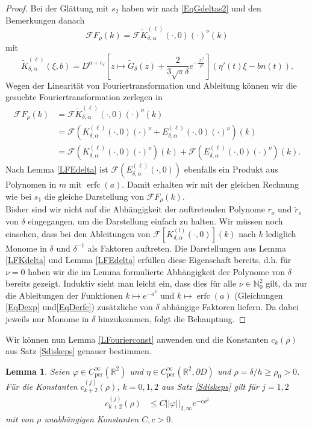 \documentclass[12pt,a4paper]{scrartcl}
\newtheorem{Lemma}[Satz]{Lemma}
\numberwithin{equation}{section}
\newcommand{\R}{\mathbb{R}} %
\newcommand{\N}{\mathbb{N}} %
\newcommand{\F}{\mathcal{F}} %
\newcommand{\per}{\operatorname{per}}
\newcommand{\erfc}{\operatorname{erfc}}
\begin{document}
\begin{proof}
Bei der Glättung mit $s_2$ haben wir nach \eqref{EqGdeltas2} und den Bemerkungen danach
\[
\F F_\rho(k) = \F \widetilde K_{\delta,\alpha}^{(\ell)}(\cdot,0)(\cdot)^\nu (k)
\]
mit
\[
\widetilde K_{\delta,\alpha}^{(\ell)}(\xi,b)=D^{\alpha+e_\ell}\left[z \mapsto \widetilde G_\delta(z) + \frac{2}{3 \sqrt{\pi} \delta } e^{-\frac{|z|^2}{\delta^2}}\right](\eta'(t) \xi - b n(t)).
\]
Wegen der Linearität von Fouriertransformation und Ableitung können wir die gesuchte Fouriertransformation zerlegen in
\begin{align*}
\F F_\rho(k) &= \F \widetilde K_{\delta,\alpha}^{(\ell)}(\cdot,0)(\cdot)^\nu (k) \\
&= \F \left(K_{\delta,\alpha}^{(\ell)}(\cdot,0)(\cdot)^\nu + E_{\delta,\alpha}^{(\ell)}(\cdot,0)(\cdot)^\nu\right)(k) \\
&= \F \left(K_{\delta,\alpha}^{(\ell)}(\cdot,0)(\cdot)^\nu\right)(k) +\F \left( E_{\delta,\alpha}^{(\ell)}(\cdot,0)(\cdot)^\nu \right)(k).
\end{align*}
Nach Lemma \ref{LFEdelta} ist $\F \left( E_{\delta,\alpha}^{(\ell)}(\cdot,0) \right)$ ebenfalls ein Produkt aus Polynomen in $m$ mit $\erfc(a)$. Damit erhalten wir mit der gleichen Rechnung wie bei $s_1$ die gleiche Darstellung von $\F F_\rho(k)$. 
\\
Bisher sind wir nicht auf die Abhängigkeit der auftretenden Polynome $r_o$ und $\tilde r_o$ von $\delta$ eingegangen, um die Darstellung einfach zu halten. Wir müssen noch einsehen, dass bei den Ableitungen von $\F[ K_{\delta,\alpha}^{(l)}(\cdot,0)](k)$ nach $k$ lediglich Monome in $\delta$ und $\delta^{-1}$ als Faktoren auftreten. Die Darstellungen aus Lemma \ref{LFKdelta} und Lemma \ref{LFEdelta} erfüllen diese Eigenschaft bereits, d.h. für $\nu=0$ haben wir die im Lemma formulierte Abhängigkeit der Polynome von $\delta$ bereits gezeigt. Induktiv sieht man leicht ein, dass dies für alle $\nu\in \N_0^2$ gilt, da nur die Ableitungen der Funktionen $k \mapsto e^{-a^2}$ und $k \mapsto \erfc(a)$ (Gleichungen \eqref{EqDexp} und\eqref{EqDerfc}) zusätzliche von $\delta$ abhängige Faktoren liefern. Da dabei jeweils nur Monome in $\delta$ hinzukommen, folgt die Behauptung.   
\end{proof}
Wir können nun Lemma \ref{LFourierconst} anwenden und die Konstanten $c_k(\rho)$ aus Satz \ref{Sdiskeps} genauer bestimmen.
\begin{Lemma} \label{Lck}
Seien $\varphi \in C_{\per}^\infty(\R^2)$ und $\eta \in C_{\per}^\infty(\R^2, \partial D)$ und $\rho=\delta/h \geq \rho_0 >0$. Für die Konstanten $c_{k+2}^{(j)}(\rho)$,  $k=0,1,2$ aus Satz \ref{Sdiskeps} gilt für $j=1,2$
\begin{align*}
c_{k+2}^{(j)}(\rho) &\leq C ||\varphi||_{2,\infty} e^{-c \rho^2}
\end{align*}
mit von $\rho$ unabhängigen Konstanten $C,c>0$.
\end{Lemma}
\end{document}
